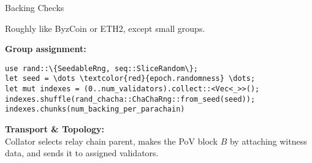 \documentclass{beamer}
\begin{document}

\begin{frame}[t,fragile]{Backing Checks}

Roughly like ByzCoin or ETH2, except small groups.

\bigskip

{\bf Group assignment:} \\ \smallskip
\begin{Verbatim}[commandchars=\\\{\}]
use rand::\{SeedableRng, seq::SliceRandom\};
let seed = \dots \textcolor{red}{epoch.randomness} \dots;
let mut indexes = (0..num_validators).collect::<Vec<_>>();
indexes.shuffle(rand_chacha::ChaChaRng::from_seed(seed));
indexes.chunks(num_backing_per_parachain)
\end{Verbatim}

\bigskip

{\bf Transport \& Topology:} \\ \smallskip
Collator selects relay chain parent, makes the PoV block $B$ by attaching witness data, and sends it to assigned validators.

\bigskip


\end{frame}
\end{document}
